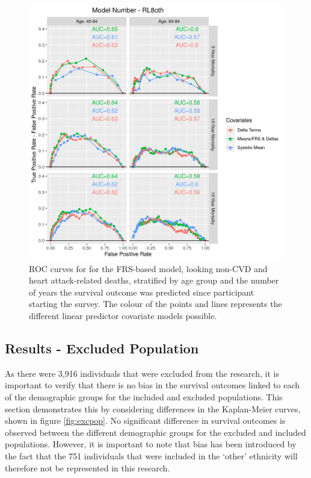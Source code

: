 \documentclass[
]{article}
\begin{document}
\begin{figure}
\centering
\includegraphics{./Rmarkdown_Plots/ROC_CAx-Covariates_EventType_RL8oth.png}
\caption{ROC curves for for the FRS-based model, looking non-CVD and heart attack-related deaths, stratified by age group and the number of years the survival outcome was predicted since participant starting the survey. The colour of the points and lines represents the different linear predictor covariate models possible.}\label{fig:ROC_RL8oth}
\end{figure}

\subsection{Results - Excluded Population}\label{results---excluded-population}

As there were 3,916 individuals that were excluded from the research, it is important to verify that there is no bias in the survival outcomes linked to each of the demographic groups for the included and excluded populations. This section demonstrates this by considering differences in the Kaplan-Meier curves, shown in figure \ref{fig:excpop}. No significant difference in survival outcomes is observed between the different demographic groups for the excluded and included populations. However, it is important to note that bias has been introduced by the fact that the 751 individuals that were included in the `other' ethnicity will therefore not be represented in this research.
\end{document}
